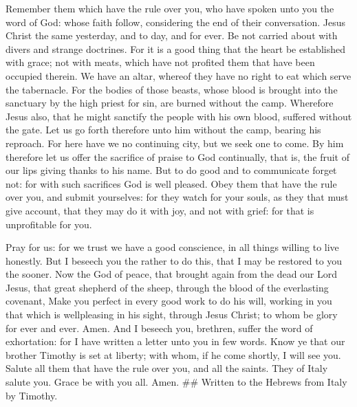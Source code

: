  Remember them which have the rule over you, who have
spoken unto you the word of God: whose faith follow, considering the end
of their conversation.  Jesus Christ the same yesterday,
and to day, and for ever.  Be not carried about with
divers and strange doctrines. For it is a good thing that the heart be
established with grace; not with meats, which have not profited them
that have been occupied therein.  We have an altar,
whereof they have no right to eat which serve the tabernacle.
 For the bodies of those beasts, whose blood is brought
into the sanctuary by the high priest for sin, are burned without the
camp.  Wherefore Jesus also, that he might sanctify the
people with his own blood, suffered without the gate. 
Let us go forth therefore unto him without the camp, bearing his
reproach.  For here have we no continuing city, but we
seek one to come.  By him therefore let us offer the
sacrifice of praise to God continually, that is, the fruit of our lips
giving thanks to his name.  But to do good and to
communicate forget not: for with such sacrifices God is well pleased.
 Obey them that have the rule over you, and submit
yourselves: for they watch for your souls, as they that must give
account, that they may do it with joy, and not with grief: for that is
unprofitable for you.

 Pray for us: for we trust we have a good conscience, in
all things willing to live honestly.  But I beseech you
the rather to do this, that I may be restored to you the sooner.
 Now the God of peace, that brought again from the dead
our Lord Jesus, that great shepherd of the sheep, through the blood of
the everlasting covenant,  Make you perfect in every good
work to do his will, working in you that which is wellpleasing in his
sight, through Jesus Christ; to whom be glory for ever and ever. Amen.
 And I beseech you, brethren, suffer the word of
exhortation: for I have written a letter unto you in few words.
 Know ye that our brother Timothy is set at liberty; with
whom, if he come shortly, I will see you.  Salute all
them that have the rule over you, and all the saints. They of Italy
salute you.  Grace be with you all. Amen. \#\# Written to
the Hebrews from Italy by Timothy.
